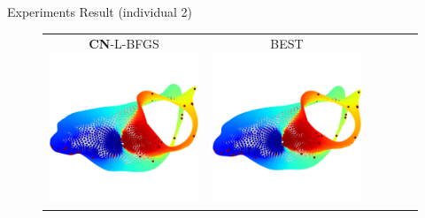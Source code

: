 \documentclass[dvipdfmx,13pt,aspectratio=169]{beamer}
\begin{document}
\begin{frame}{Experiments Result (individual 2)}
\begin{figure}[h]
\begin{tabular}{cccccc}
        \makecell{\small{\textsf{\textbf{CN}-L-BFGS}}                                                                                                        \\[-0.2em]\includegraphics[width=0.135\columnwidth]{../main/individual/vis/3elt_CN-L-BFGS.png}} &
        \makecell{\small{\textsf{BEST}}                                                                                                                      \\[-0.2em]\includegraphics[width=0.135\columnwidth]{../main/individual/vis/opt_3elt.png}} \\
      \end{tabular}
    \end{figure}
  \end{frame}
\fi
\end{document}
